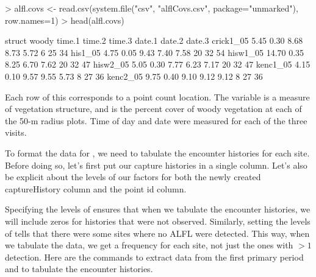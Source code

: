 \documentclass[a4paper]{article}
\renewenvironment{Schunk}{\vspace{\topsep}}{\vspace{\topsep}}
\begin{document}
\begin{Schunk}
\begin{Sinput}
> alfl.covs <- read.csv(system.file("csv", "alflCovs.csv",
     package="unmarked"), row.names=1)
> head(alfl.covs)
\end{Sinput}
\begin{Soutput}
          struct woody time.1 time.2 time.3 date.1 date.2 date.3
crick1_05   5.45  0.30   8.68   8.73   5.72      6     25     34
his1_05     4.75  0.05   9.43   7.40   7.58     20     32     54
hisw1_05   14.70  0.35   8.25   6.70   7.62     20     32     47
hisw2_05    5.05  0.30   7.77   6.23   7.17     20     32     47
kenc1_05    4.15  0.10   9.57   9.55   5.73      8     27     36
kenc2_05    9.75  0.40   9.10   9.12   9.12      8     27     36
\end{Soutput}
\end{Schunk}

Each row of this  corresponds to a point count
location. The variable  is a measure of vegetation
structure, and  is the percent cover of woody vegetation
at each of the 50-m radius plots. Time of day and date were measured
for each of the three visits.

To format the data for , we need to tabulate the
encounter histories for each site. Before doing so, let's first put
our capture histories in a single column. Let's also be explicit about
the levels of our factors for both the newly created captureHistory
column and the point id column.

\begin{Schunk}
\end{Schunk}
Specifying the levels of  ensures that when we
tabulate the encounter histories, we will include zeros for histories
that were not observed. Similarly, setting the levels of
 tells  that there
were some sites where no ALFL were detected. This way, when we
tabulate the data, we get a frequency for each site, not just the ones
with $>1$ detection. Here are the commands to extract data from the
first primary period and to tabulate the encounter
histories.
\end{document}
